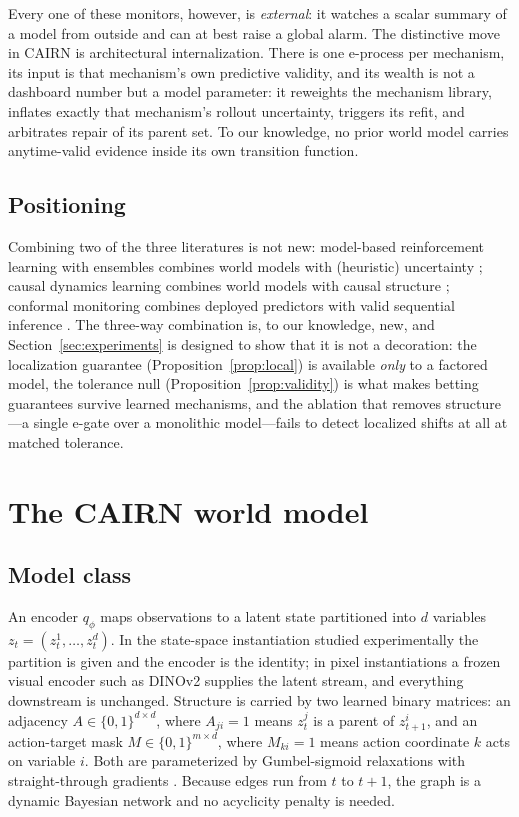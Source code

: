 \documentclass[preprint,12pt]{elsarticle}
\theoremstyle{definition}
\theoremstyle{remark}
\begin{document}
Every one of these monitors, however, is \emph{external}: it watches a
scalar summary of a model from outside and can at best raise a global
alarm. The distinctive move in CAIRN is architectural internalization.
There is one e-process per mechanism, its input is that mechanism's own
predictive validity, and its wealth is not a dashboard number but a
model parameter: it reweights the mechanism library, inflates exactly
that mechanism's rollout uncertainty, triggers its refit, and arbitrates
repair of its parent set. To our knowledge, no prior world model
carries anytime-valid evidence inside its own transition function.

\subsection{Positioning}

Combining two of the three literatures is not new: model-based
reinforcement learning with ensembles combines world models with
(heuristic) uncertainty \citep{chua2018deep}; causal dynamics learning
combines world models with causal structure \citep{wang2022causal};
conformal monitoring combines deployed predictors with valid sequential
inference \citep{gibbs2021adaptive,vovk2021testing}. The three-way
combination is, to our knowledge, new, and Section~\ref{sec:experiments}
is designed to show that it is not a decoration: the localization
guarantee (Proposition~\ref{prop:local}) is available \emph{only} to a
factored model, the tolerance null (Proposition~\ref{prop:validity}) is
what makes betting guarantees survive learned mechanisms, and the
ablation that removes structure---a single e-gate over a monolithic
model---fails to detect localized shifts at all at matched tolerance.

\section{The CAIRN world model}\label{sec:method}

\subsection{Model class}\label{sec:model}

An encoder $q_\phi$ maps observations to a latent state partitioned into
$d$ variables $z_t=(z_t^1,\dots,z_t^d)$. In the state-space instantiation
studied experimentally the partition is given and the encoder is the
identity; in pixel instantiations a frozen visual encoder such as DINOv2
\citep{oquab2024dinov2} supplies the latent stream, and everything
downstream is unchanged. Structure is carried by two learned binary
matrices: an adjacency $A\in\{0,1\}^{d\times d}$, where $A_{ji}=1$ means
$z^j_t$ is a parent of $z^i_{t+1}$, and an action-target mask
$M\in\{0,1\}^{m\times d}$, where $M_{ki}=1$ means action coordinate $k$
acts on variable $i$. Both are parameterized by Gumbel-sigmoid
relaxations with straight-through gradients
\citep{jang2017categorical,maddison2017concrete}. Because edges run from
$t$ to $t{+}1$, the graph is a dynamic Bayesian network and no acyclicity
penalty is needed.
\end{document}
